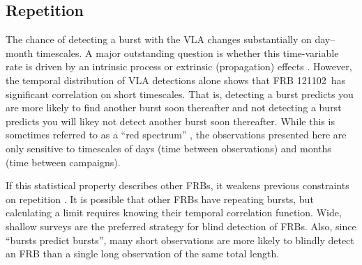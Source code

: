\documentclass[twocolumn]{aastex61}
\newcommand{\frb}{FRB 121102}
\begin{document}

\subsection{Repetition}

The chance of detecting a burst with the VLA changes substantially on day--month timescales. A major outstanding question is whether this time-variable rate is driven by an intrinsic process \citep{2016ApJ...826..226K} or extrinsic (propagation) effects \citep{CORDES}. However, the temporal distribution of VLA detections alone shows that \frb\ has significant correlation on short timescales. That is, detecting a burst predicts you are more likely to find another burst soon thereafter and not detecting a burst predicts you will likey not detect another burst soon thereafter. While this is sometimes referred to as a ``red spectrum'' \citep{2016MNRAS.458L..89C}, the observations presented here are only sensitive to timescales of days (time between observations) and months (time between campaigns). 

If this statistical property describes other FRBs, it weakens previous constraints on repetition \citep{2015MNRAS.454..457P,2015ApJ...807...16L}. It is possible that other FRBs have repeating bursts, but calculating a limit requires knowing their temporal correlation function. Wide, shallow surveys are the preferred strategy for blind detection of FRBs. Also, since ``bursts predict bursts'', many short observations are more likely to blindly detect an FRB than a single long observation of the same total length. 
\end{document}
